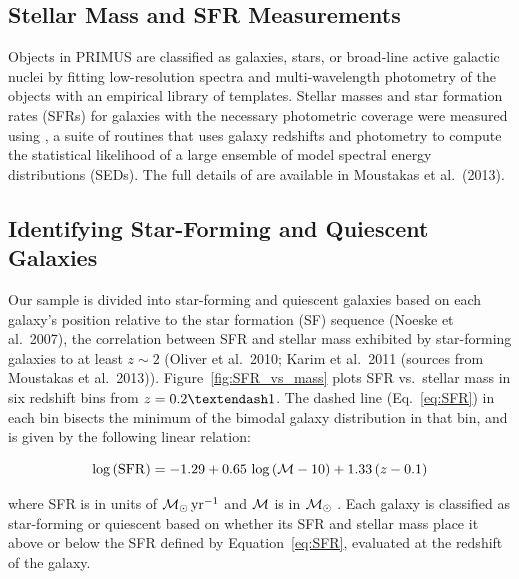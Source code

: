 \subsection{Stellar Mass and SFR Measurements}\label{sec:SFR}
 
Objects in PRIMUS are classified as galaxies, stars, or broad-line active galactic nuclei by fitting low-resolution spectra and multi-wavelength photometry of the objects with an empirical library of templates.
Stellar masses and star formation rates (SFRs) for galaxies with the necessary photometric coverage were measured using \iSEDfit, a suite of routines that uses galaxy redshifts and photometry to compute the statistical likelihood of a large ensemble of model spectral energy distributions (SEDs).
The full details of \iSEDfit are available in Moustakas et al.~(2013).


\subsection{Identifying Star-Forming and Quiescent Galaxies}\label{sec:SFQ}

Our sample is divided into star-forming and quiescent galaxies based on each galaxy's position relative to the star formation (SF) sequence (Noeske et al.~2007), the correlation between SFR and stellar mass exhibited by star-forming galaxies to at least ${z \sim 2}$ (Oliver et al.~2010; Karim et al.~2011 (sources from Moustakas et al.~2013)).
Figure~\ref{fig:SFR_vs_mass} plots SFR vs.~stellar mass in six redshift bins from ${z=0.2\textendash1}$.
The dashed line (Eq.~\ref{eq:SFR}) in each bin bisects the minimum of the bimodal galaxy distribution in that bin, and is given by the following linear relation:

\begin{equation}\label{eq:SFR}
\log\,({\rm SFR}) = -1.29 + 0.65\,\log\,(\mass - 10) + 1.33\,(z - 0.1)
\end{equation}

\noindent where SFR is in units of $\mathcal{M}_{\odot}\,\textrm{yr}^{-1}$ and $\mass$ is in $\mathcal{M}_{\odot}$ .
Each galaxy is classified as star-forming or quiescent based on whether its SFR and stellar mass place it above or below the SFR defined by Equation~\ref{eq:SFR}, evaluated at the redshift of the galaxy.


